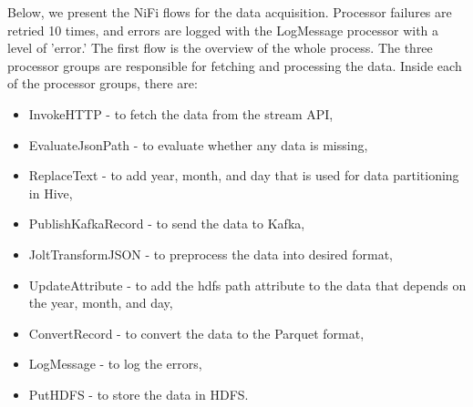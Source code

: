 \documentclass[12pt,a4paper, hidelinks]{article}
\begin{document}
Below, we present the NiFi flows for the data acquisition. Processor failures are retried 10 times, and errors are logged with the LogMessage processor with a level of 'error.' The first flow is the overview of the whole process. The three processor groups are responsible for fetching and processing the data. Inside each of the processor groups, there are:
\begin{itemize}
    \item InvokeHTTP - to fetch the data from the stream API,
    \item EvaluateJsonPath - to evaluate whether any data is missing,
    \item ReplaceText - to add year, month, and day that is used for data partitioning in Hive,
    \item PublishKafkaRecord - to send the data to Kafka,
    \item JoltTransformJSON - to preprocess the data into desired format,
    \item UpdateAttribute - to add the hdfs path attribute to the data that depends on the year, month, and day,
    \item ConvertRecord - to convert the data to the Parquet format,
    \item LogMessage - to log the errors,
    \item PutHDFS - to store the data in HDFS.
\end{itemize}
\end{document}
